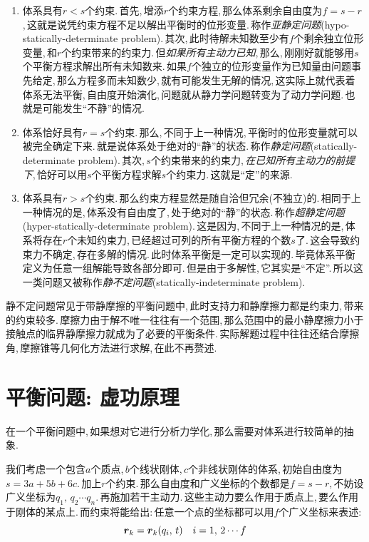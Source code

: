 \begin{enumerate}
  \item 体系具有$r<s$个约束.\,首先,\,增添$r$个约束方程,\,那么体系剩余自由度为$f=s-r$,\,这就是说凭约束方程不足以解出平衡时的位形变量.\,称作\emph{亚静定问题}(hypo-statically-determinate problem).\,其次,\,此时待解未知数至少有$f$个剩余独立位形变量,\,和$r$个约束带来的约束力.\,但\emph{如果所有主动力已知},\,那么,\,刚刚好就能够用$s$个平衡方程求解出所有未知数来.\,如果$f$个独立的位形变量作为已知量由问题事先给定,\,那么方程多而未知数少,\,就有可能发生无解的情况,\,这实际上就代表着体系无法平衡,\,自由度开始演化,\,问题就从静力学问题转变为了动力学问题.\,也就是可能发生``不静''的情况.
  \item 体系恰好具有$r=s$个约束.\,那么,\,不同于上一种情况,\,平衡时的位形变量就可以被完全确定下来.\,就是说体系处于绝对的``静''的状态.\,称作\emph{静定问题}(statically-determinate problem).\,其次,\,$s$个约束带来的约束力,\,\emph{在已知所有主动力的前提下},\,恰好可以用$s$个平衡方程求解$s$个约束力.\,这就是``定''的来源.
  \item 体系具有$r>s$个约束.\,那么约束方程显然是随自洽但冗余(不独立)的.\,相同于上一种情况的是,\,体系没有自由度了,\,处于绝对的``静''的状态.\,称作\emph{超静定问题}(hyper-statically-determinate problem).\,这是因为,\,不同于上一种情况的是,\,体系将存在$r$个未知约束力,\,已经超过可列的所有平衡方程的个数$s$了.\,这会导致约束力不确定,\,存在多解的情况.\,此时体系平衡是一定可以实现的.\,毕竟体系平衡定义为任意一组解能导致各部分即可.\,但是由于多解性,\,它其实是``不定''.\,所以这一类问题又被称作\emph{静不定问题}(statically-indeterminate problem).
\end{enumerate}

静不定问题常见于带静摩擦的平衡问题中,\,此时支持力和静摩擦力都是约束力,\,带来的约束较多.\,摩擦力由于解不唯一往往有一个范围,\,那么范围中的最小静摩擦力小于接触点的临界静摩擦力就成为了必要的平衡条件.\,实际解题过程中往往还结合摩擦角,\,摩擦锥等几何化方法进行求解,\,在此不再赘述.


\section{平衡问题:  虚功原理}

在一个平衡问题中,\,如果想对它进行分析力学化,\,那么需要对体系进行较简单的抽象.

我们考虑一个包含$a$个质点,\,$b$个线状刚体,\,$c$个非线状刚体的体系,\,初始自由度为$s=3a+5b+6c$.\,加上$r$个约束.\,那么自由度和广义坐标的个数都是$f=s-r$,\,不妨设广义坐标为$q_1,\,q_2\cdots q_n$.\,再施加若干主动力.\,这些主动力要么作用于质点上,\,要么作用于刚体的某点上.\,而约束将能给出:\,任意一个点的坐标都可以用$f$个广义坐标来表述:
\[\boldsymbol{r}_k=\boldsymbol{r}_k(q_i,\,t)\quad i=1,\,2\cdots f\]

